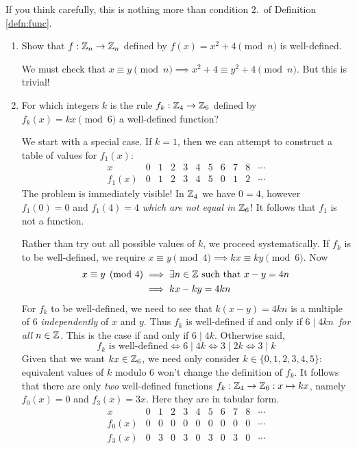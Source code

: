 If you think carefully, this is nothing more than condition 2.\ of Definition \ref{defn:func}.

\begin{examples}{}{}
\begin{enumerate}
	\item Show that $f:\mathbb{Z}_n\to\mathbb{Z}_n$ defined by $f(x)=x^2+4\pmod n$ is well-defined.\par
	We must check that $x\equiv y\pmod n\implies x^2+4\equiv y^2+4\pmod n$. But this is trivial!
	\item For which integers $k$ is the rule $f_k:\mathbb{Z}_4\to\mathbb{Z}_6$ defined by $f_k(x)=kx\pmod 6$ a well-defined function?\par
	We start with a special case. If $k=1$, then we can attempt to construct a table of values for $f_1(x)$:
	\[
		\begin{array}{c|cccc|cccc|cc}
			x&0&1&2&3&4&5&6&7&8&\cdots\\\hline
			f_1(x)&0&1&2&3&4&5&0&1&2&\cdots
		\end{array}
	\]
	The problem is immediately visible! In $\mathbb{Z}_4$ we have $0=4$, however $f_1(0)=0$ and $f_1(4)=4$ \emph{which are not equal in $\mathbb{Z}_6$}! It follows that $f_1$ is not a function.\par
	Rather than try out all possible values of $k$, we proceed systematically. If $f_k$ is to be well-defined, we require $x\equiv y\pmod 4\implies kx\equiv ky\pmod 6$. Now
	\begin{align*}
		x\equiv y\pmod 4&\implies \exists n\in\mathbb{Z}\text{ such that }x-y=4n\\*
		&\implies kx-ky=4kn
	\end{align*}
	For $f_k$ to be well-defined, we need to see that $k(x-y)=4kn$ is a multiple of 6 \emph{independently} of $x$ and $y$. Thus $f_k$ is well-defined if and only if $6\mid 4kn$\, \emph{for all} $n\in\mathbb{Z}$. This is the case if and only if $6\mid 4k$. Otherwise said,
	\[
		\text{$f_k$ is well-defined}\iff 6\mid 4k\iff 3\mid 2k\iff 3\mid k
	\]
	Given that we want $kx\in\mathbb{Z}_6$, we need only consider $k\in\{0,1,2,3,4,5\}$: equivalent values of $k$ modulo 6 won't change the definition of $f_k$. It follows that there are only \emph{two} well-defined functions $f_k:\mathbb{Z}_4\to\mathbb{Z}_6:x\mapsto kx$, namely $f_0(x)=0$ and $f_3(x)=3x$. Here they are in tabular form.
	\[
		\begin{array}{c|cccc|cccc|cc}
			x&0&1&2&3&4&5&6&7&8&\cdots\\\hline
			f_0(x)&0&0&0&0&0&0&0&0&0&\cdots\\\hline
			f_3(x)&0&3&0&3&0&3&0&3&0&\cdots

\end{array}\]
\end{enumerate}
\end{examples}
